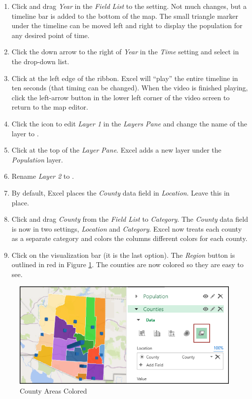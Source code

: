 \begin{enumerate}[resume]
	\item Click and drag \textit{Year} in the \textit{Field List} to the  setting. Not much changes, but a timeline bar is added to the bottom of the map. The small triangle marker under the timeline can be moved left and right to display the population for any desired point of time.
	\item Click the down arrow to the right of \textit{Year} in the \textit{Time} setting and select  in the drop-down list.
	\item Click  at the left edge of the ribbon. Excel will ``play'' the entire timeline in ten seconds (that timing can be changed). When the video is finished playing, click the left-arrow button in the lower left corner of the video screen to return to the map editor.
	\item Click the  icon to edit \textit{Layer 1} in the \textit{Layers Pane} and change the name of the layer to .

	\item Click  at the top of the \textit{Layer Pane}. Excel adds a new layer under the \textit{Population} layer.
	\item Rename \textit{Layer 2} to .
	\item By default, Excel places the \textit{County} data field in \textit{Location}. Leave this in place.
	\item Click and drag \textit{County} from the \textit{Field List} to \textit{Category}. The \textit{County} data field is now in two settings, \textit{Location} and \textit{Category}. Excel now treats each county as a separate category and colors the columns different colors for each county.
	\item Click  on the visualization bar (it is the last option). The \textit{Region} button is outlined in red in Figure \ref{08:fig28}. The counties are now colored so they are easy to see. 
\end{enumerate}

\begin{figure}[H]
	\centering
	\includegraphics[width=\maxwidth{.85\linewidth}]{gfx/ch08_fig28}
	\caption{County Areas Colored}
	\label{08:fig28}
\end{figure}

